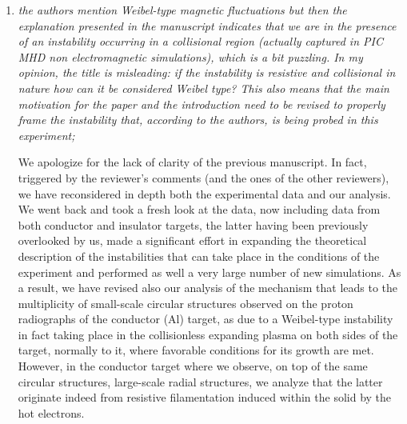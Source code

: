 \documentclass{article}
\begin{document}
\begin{enumerate}
\item  \textit{the authors mention Weibel-type magnetic fluctuations but then the explanation presented in the manuscript indicates that we are in the presence of an instability occurring in a collisional region (actually captured in PIC MHD non electromagnetic simulations), which is a bit puzzling. In my opinion, the title is misleading: if the instability is resistive and collisional in nature how can it be considered Weibel type? This also means that the main motivation for the paper and the introduction need to be revised to properly frame the instability that, according to the authors, is being probed in this experiment; }

We apologize for the lack of clarity of the  previous manuscript.
In fact, triggered by the reviewer’s comments (and the ones of the other reviewers), we have reconsidered in depth both the experimental data and our analysis. We went back and took a fresh look at the data, now including data from both conductor and insulator targets, the latter having been previously overlooked by us, made a significant effort in expanding the theoretical description of the instabilities that can take place in the conditions of the experiment and performed as well a very large number of new simulations. 
As a result, we have revised also our analysis of the mechanism that leads to the multiplicity of small-scale circular structures observed on the proton radiographs of the conductor (Al) target, as due to a Weibel-type instability in fact taking place in the collisionless expanding plasma on both sides of the target, normally to it, where favorable conditions for its growth are met.
However, in the conductor target where we observe, on top of the same circular structures, large-scale radial structures, we analyze that the latter originate indeed from resistive filamentation induced within the solid by the hot electrons.


\end{enumerate}
\end{document}
